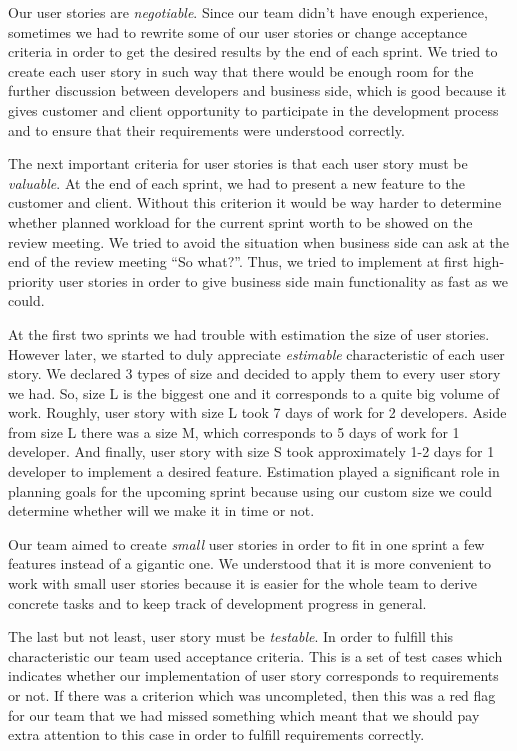 Our user stories are \emph{negotiable}. Since our team didn’t have enough experience, sometimes we had to rewrite some of our user stories or change acceptance criteria in order to get the desired results by the end of each sprint. We tried to create each user story in such way that there would be enough room for the further discussion between developers and business side, which is good because it gives customer and client opportunity to participate in the development process and to ensure that their requirements were understood correctly.

The next important criteria for user stories is that each user story must be  \emph{valuable}. At the end of each sprint, we had to present a new feature to the customer and client. Without this criterion it would be way harder to determine whether planned workload for the current sprint worth to be showed on the review meeting. We tried to avoid the situation when business side can ask at the end of the review meeting “So what?”. Thus, we tried to implement at first high-priority user stories in order to give business side main functionality as fast as we could.

At the first two sprints we had trouble with estimation the size of user stories. However later, we started to duly appreciate  \emph{estimable} characteristic of each user story. We declared 3 types of size and decided to apply them to every user story we had. So, size L is the biggest one and it corresponds to a quite big volume of work. Roughly, user story with size L took 7 days of work for 2 developers. Aside from size L there was a size M, which corresponds to 5 days of work for 1 developer. And finally, user story with size S took approximately 1-2 days for 1 developer to implement a desired feature. Estimation played a significant role in planning goals for the upcoming sprint because using our custom size we could determine whether will we make it in time or not. 

Our team aimed to create \emph{small} user stories in order to fit in one sprint a few features instead of a gigantic one. We understood that it is more convenient to work with small user stories because it is easier for the whole team to derive concrete tasks and to keep track of development progress in general.

The last but not least, user story must be  \emph{testable}. In order to fulfill this characteristic our team used acceptance criteria. This is a set of test cases which indicates whether our implementation of user story corresponds to requirements or not. If there was a criterion which was uncompleted, then this was a red flag for our team that we had missed something which meant that we should pay extra attention to this case in order to fulfill requirements correctly.

